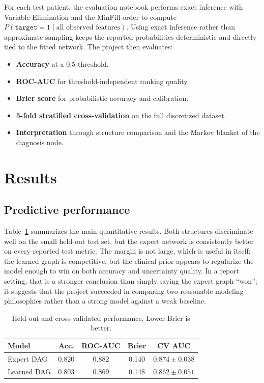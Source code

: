 \documentclass[10pt,twocolumn]{article}
\begin{document}
For each test patient, the evaluation notebook performs exact inference with Variable Elimination and the MinFill order to compute $P(\texttt{target}=1\mid\text{all observed features})$. Using exact inference rather than approximate sampling keeps the reported probabilities deterministic and directly tied to the fitted network. The project then evaluates:
\begin{itemize}
  \item \textbf{Accuracy} at a 0.5 threshold.
  \item \textbf{ROC-AUC} for threshold-independent ranking quality.
  \item \textbf{Brier score} for probabilistic accuracy and calibration.
  \item \textbf{5-fold stratified cross-validation} on the full discretized dataset.
  \item \textbf{Interpretation} through structure comparison and the Markov blanket of the diagnosis node.
\end{itemize}

\section{Results}

\subsection{Predictive performance}
Table~\ref{tab:results} summarizes the main quantitative results. Both structures discriminate well on the small held-out test set, but the expert network is consistently better on every reported test metric. The margin is not large, which is useful in itself: the learned graph is competitive, but the clinical prior appears to regularize the model enough to win on both accuracy and uncertainty quality. In a report setting, that is a stronger conclusion than simply saying the expert graph ``won''; it suggests that the project succeeded in comparing two reasonable modeling philosophies rather than a strong model against a weak baseline.

\begin{table}[t]
\centering
\small
\caption{Held-out and cross-validated performance. Lower Brier is better.}
\setlength{\tabcolsep}{4pt}
\begin{tabular}{lcccc}
\toprule
Model & Acc. & ROC-AUC & Brier & CV AUC \\
\midrule
Expert DAG & 0.820 & 0.882 & 0.140 & $0.874 \pm 0.038$ \\
Learned DAG & 0.803 & 0.869 & 0.148 & $0.862 \pm 0.051$ \\
\bottomrule
\end{tabular}
\label{tab:results}
\end{table}
\end{document}
